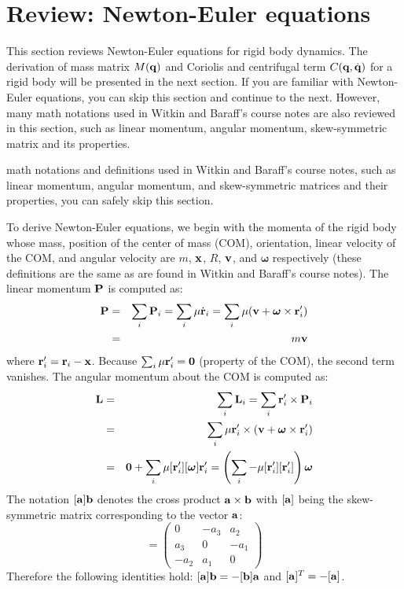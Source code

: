 \section{Review: Newton-Euler equations}
This section reviews Newton-Euler equations for rigid body
dynamics. The derivation of mass matrix $M(\mathbf{q})$ and Coriolis and
centrifugal term $C(\mathbf{q}, \dot{\mathbf{q}})$ for a rigid body will be
presented in the next section. If you are familiar with Newton-Euler
equations, you can skip this section and continue to the
next. However, many math notations used in Witkin and Baraff's course
notes are also reviewed in this section, such as linear momentum,
angular momentum, skew-symmetric matrix and its properties.

math notations
and definitions used in Witkin and Baraff's course notes, such as
linear momentum, angular momentum, and 
skew-symmetric matrices and their properties, you can safely skip this
section.

To derive Newton-Euler equations, we begin with the momenta of the
rigid body whose mass, position of the center of mass (COM),
orientation, linear velocity of the COM, and angular velocity are $m$,
$\mathbf{x}$, $R$, $\mathbf{v}$, and $\bm{\omega}$ respectively (these
definitions are the same as are found in Witkin and Baraff's course
notes). The linear momentum $\mathbf{P}$ is computed as:
\begin{eqnarray}
\label{eq:momentum}
\mathbf{P} &=& \sum_i \mathbf{P}_i = \sum_i \mathbf{\mu} \dot{\mathbf{r}}_i = \sum_i  \mathbf{\mu} (\mathbf{v} + \bm{\omega}
    \times \mathbf{r}_i') \nonumber \\
 &=& m \mathbf{v}
\end{eqnarray}
where $\mathbf{r}_i' = \mathbf{r}_i - \mathbf{x}$. Because $\sum_i \mathbf{\mu}
\mathbf{r}_i' = \mathbf{0}$ (property of the COM), the second term vanishes. The angular momentum  about the COM is computed as:
\begin{eqnarray}
\nonumber
\mathbf{L} & = & \sum_i \mathbf{L}_i  = \sum_i \mathbf{r}_i' \times \mathbf{P}_i\\
\nonumber
& = & \sum_i \mathbf{\mu} \mathbf{r}_i' \times (\mathbf{v} + \bm{\omega} \times \mathbf{r}_i')\\
&= & \mathbf{0} + \sum_i \mathbf{\mu} [\mathbf{r}_i'][\bm{\omega}]\mathbf{r}_i' = \left ( \sum_i -\mathbf{\mu} [\mathbf{r}_i'][\mathbf{r}_i'] \right )\bm{\omega}
\end{eqnarray}
The notation $[\mathbf{a}] \mathbf{b}$ denotes the cross product $\mathbf{a}\times \mathbf{b}$ with $[\mathbf{a}]$ being the skew-symmetric matrix corresponding to the vector $\mathbf{a}$:
\begin{equation}
[\vc{a}] = 
\begin{pmatrix}
0 & -a_3 & a_2\\
a_3&  0 & -a_1\\
-a_2 & a_1 & 0
\end{pmatrix}
\end{equation}
Therefore the following identities hold: $[\mathbf{a}]\mathbf{b} = -[\mathbf{b}]\mathbf{a}$ and $[\mathbf{a}]^T = -[\mathbf{a}]$.

